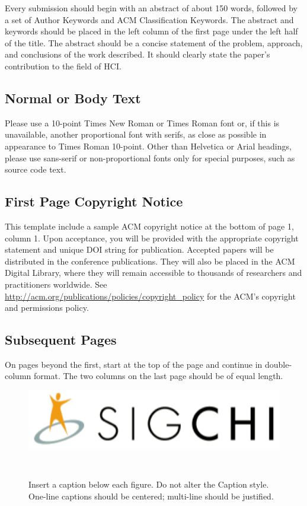 \documentclass{sigchi}
\begin{document}
Every submission should begin with an abstract of about 150 words,
followed by a set of Author Keywords and ACM Classification
Keywords. The abstract and keywords should be placed in the left
column of the first page under the left half of the title. The
abstract should be a concise statement of the problem, approach, and
conclusions of the work described. It should clearly state the paper's
contribution to the field of HCI\@.

\subsection{Normal or Body Text}

Please use a 10-point Times New Roman or Times Roman font or, if this
is unavailable, another proportional font with serifs, as close as
possible in appearance to Times Roman 10-point. Other than Helvetica
or Arial headings, please use sans-serif or non-proportional fonts
only for special purposes, such as source code text.

\subsection{First Page Copyright Notice}
This template include a sample ACM copyright notice at the bottom of
page 1, column 1.  Upon acceptance, you will be provided with the
appropriate copyright statement and unique DOI string for publication.
Accepted papers will be distributed in the conference
publications. They will also be placed in the ACM Digital Library,
where they will remain accessible to thousands of researchers and
practitioners worldwide. See
\url{http://acm.org/publications/policies/copyright_policy} for the
ACM's copyright and permissions policy.

\subsection{Subsequent Pages}

On pages beyond the first, start at the top of the page and continue
in double-column format.  The two columns on the last page should be
of equal length.

\begin{figure}
\centering
  \includegraphics[width=0.9\columnwidth]{figures/sigchi-logo}
  \caption{Insert a caption below each figure. Do not alter the
    Caption style.  One-line captions should be centered; multi-line
    should be justified. }~\label{fig:figure1}
\end{figure}
\end{document}
